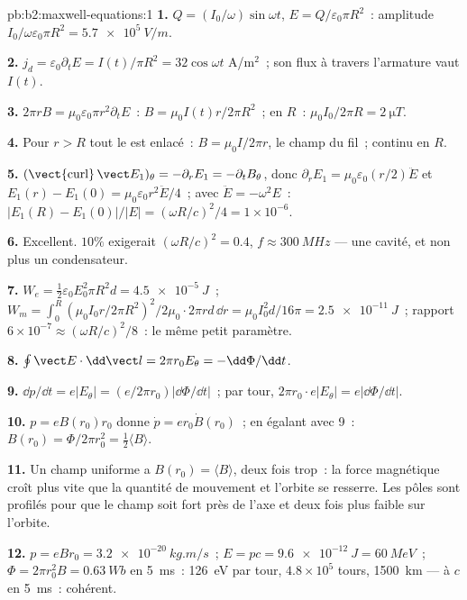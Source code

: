 \begin{solution}{pb:b2:maxwell-equations:1}
\textbf{1.} $Q = (I_0/\omega)\sin\omega t$, $E = Q/\varepsilon_0\pi R^2$~: amplitude $I_0/\omega\varepsilon_0
\pi R^2 = \qty{5.7e5}{V/m}$.

\textbf{2.} $j_d = \varepsilon_0\partial_tE = I(t)/\pi R^2 = 32\cos\omega t$ A/m$^2$~; son flux
à travers l'armature vaut $I(t)$.

\textbf{3.} $2\pi rB = \mu_0\varepsilon_0\pi r^2\partial_tE$~: $B = \mu_0I(t)r/2\pi R^2$~; en $R$~:
$\mu_0I_0/2\pi R = \qty{2}{\micro T}$.

\textbf{4.} Pour $r > R$ tout le  est enlacé~: $B =
\mu_0I/2\pi r$, le champ du fil~; continu en $R$.

\textbf{5.} $(\operatorname{\vect{curl}}\vect E_1)_\theta = -\partial_rE_1 = -\partial_tB_\theta$, donc $\partial_rE_1
= \mu_0\varepsilon_0(r/2)\ddot E$ et $E_1(r) - E_1(0) = \mu_0\varepsilon_0r^2\ddot E/4$~; avec
$\ddot E = -\omega^2E$~: $|E_1(R) - E_1(0)|/|E| = (\omega R/c)^2/4 = 1 \times 10^{-6}$.

\textbf{6.} Excellent. $10\%$ exigerait $(\omega R/c)^2 = 0.4$, $f \approx \qty{300}{MHz}$ ---
une cavité, et non plus un condensateur.

\textbf{7.} $W_e = \tfrac12\varepsilon_0E_0^2\pi R^2d = \qty{4.5e-5}{J}$~; $W_m = \int_0^R(\mu_0I_0r/
2\pi R^2)^2/2\mu_0\cdot2\pi rd\,\dd r = \mu_0I_0^2d/16\pi = \qty{2.5e-11}{J}$~; rapport $6 \times
10^{-7} \approx (\omega R/c)^2/8$~: le même petit paramètre.

\textbf{8.} $\oint\vect E\cdot\dd\vect l = 2\pi r_0E_\theta = -\dd\Phi/\dd t$.

\textbf{9.} $\dd p/\dd t = e|E_\theta| = (e/2\pi r_0)|\dd\Phi/\dd t|$~; par tour,
$2\pi r_0\cdot e|E_\theta| = e|\dd\Phi/\dd t|$.

\textbf{10.} $p = eB(r_0)r_0$ donne $\dot p = er_0\dot B(r_0)$~; en égalant avec 9~:
$B(r_0) = \Phi/2\pi r_0^2 = \tfrac12\langle B\rangle$.

\textbf{11.} Un champ uniforme a $B(r_0) = \langle B\rangle$, deux fois trop~:
la force magnétique croît plus vite que la quantité de mouvement et l'orbite
se resserre. Les pôles sont profilés pour que le champ soit fort près de
l'axe et deux fois plus faible sur l'orbite.

\textbf{12.} $p = eBr_0 = \qty{3.2e-20}{kg.m/s}$~; $E = pc = \qty{9.6e-12}{J} = \qty{60}{MeV}$~;
$\Phi = 2\pi r_0^2B = \qty{0.63}{Wb}$ en \qty{5}{ms}~: \qty{126}{eV} par tour, $4.8 \times
10^5$ tours, \qty{1500}{km} --- à $c$ en \qty{5}{ms}~: cohérent.


\end{solution}
